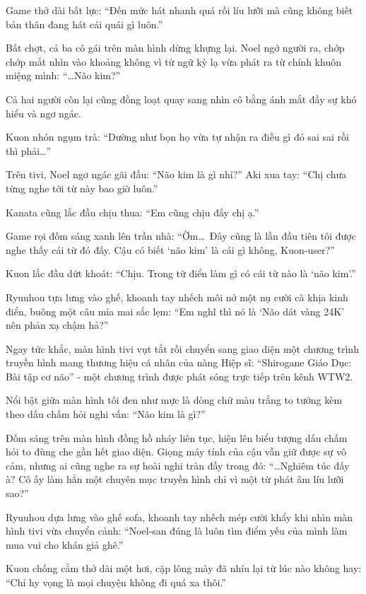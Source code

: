 \documentclass[../main.tex]{subfiles}
\begin{document}
Game thở dài bất lực: ``Đến mức hát nhanh quá rồi líu lưỡi mà cũng không biết bản thân đang hát cái quái gì luôn.''

Bất chợt, cả ba cô gái trên màn hình dừng khựng lại. Noel ngớ người ra, chớp chớp mắt nhìn vào khoảng không vì từ ngữ kỳ lạ vừa phát ra từ chính khuôn miệng mình: ``\dots Não kim?''

Cả hai người còn lại cũng đồng loạt quay sang nhìn cô bằng ánh mắt đầy sự khó hiểu và ngơ ngác.

Kuon nhón ngụm trà: ``Dường như bọn họ vừa tự nhận ra điều gì đó sai sai rồi thì phải\dots''

Trên tivi, Noel ngơ ngác gãi đầu: ``Não kim là gì nhỉ?'' Aki xua tay: ``Chị chưa từng nghe tới từ này bao giờ luôn.''

Kanata cũng lắc đầu chịu thua: ``Em cũng chịu đấy chị ạ.''

Game rọi đốm sáng xanh lên trần nhà: ``Ờm\dots\ Đây cũng là lần đầu tiên tôi được nghe thấy cái từ đó đấy. Cậu có biết `não kim' là cái gì không, Kuon-user?''

Kuon lắc đầu dứt khoát: ``Chịu. Trong từ điển làm gì có cái từ nào là `não kim'.''

Ryuuhou tựa lưng vào ghế, khoanh tay nhếch môi nở một nụ cười cà khịa kinh điển, buông một câu mỉa mai sắc lẹm: ``Em nghĩ thì nó là `Não dát vàng 24K' nên phản xạ chậm hả?''

\ct

Ngay tức khắc, màn hình tivi vụt tắt rồi chuyển sang giao diện một chương trình truyền hình mang thương hiệu cá nhân của nàng Hiệp sĩ: ``Shirogane Giáo Dục: Bài tập cơ não'' - một chương trình được phát sóng trực tiếp trên kênh WTW2.

Nổi bật giữa màn hình tối đen như mực là dòng chữ màu trắng to tướng kèm theo dấu chấm hỏi nghi vấn: ``Não kim là gì?''

Đốm sáng trên màn hình đồng hồ nháy liên tục, hiện lên biểu tượng dấu chấm hỏi to đùng che gần hết giao diện. Giọng máy tính của cậu vẫn giữ được sự vô cảm, nhưng ai cũng nghe ra sự hoài nghi tràn đầy trong đó: ``\dots Nghiêm túc đấy à? Cô ấy làm hẳn một chuyên mục truyền hình chỉ vì một từ phát âm líu lưỡi sao?''

Ryuuhou dựa lưng vào ghế sofa, khoanh tay nhếch mép cười khẩy khi nhìn màn hình tivi vừa chuyển cảnh: ``Noel-san đúng là luôn tìm điểm yếu của mình làm mua vui cho khán giả ghê.''

Kuon chống cằm thở dài một hơi, cặp lông mày đã nhíu lại từ lúc nào không hay: ``Chỉ hy vọng là mọi chuyện không đi quá xa thôi.''
\end{document}
